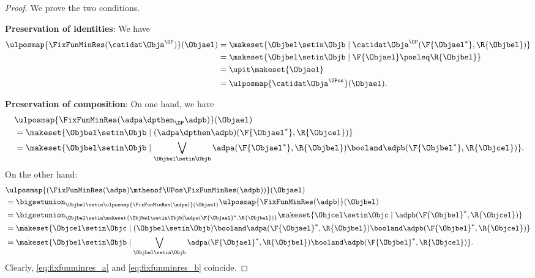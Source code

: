 \begin{proof}
    We prove the two conditions.

    \textbf{Preservation of identities}:
    We have
    \begin{equation}
        \begin{aligned}
            \ulposmap{\FixFunMinRes(\catidat\Obja^{\DP})}(\Objael) & =\makeset{ \Objbel\setin \Objb\mid \catidat\Obja^{\DP}(\F{\Objael^*},\R{\Objbel})} \\
                                                                   & =\makeset{ \Objbel \setin \Objb\mid \F{\Objael}\posleq\R{\Objbel}} \\
                                                                   & =\upit \makeset{ \Objael} \\
                                                                   & =\ulposmap{\catidat\Obja^{\UPos}}(\Objael).
        \end{aligned}
    \end{equation}

    \textbf{Preservation of composition}:
    On one hand, we have
    \begin{equation}
        \label{eq:fixfunminres_a}
        \begin{aligned}
            ~ & \ulposmap{\FixFunMinRes(\adpa\dpthen_\DP \adpb)}(\Objael) \\
              & =\makeset{ \Objbel\setin \Objb\mid (\adpa\dpthen \adpb)(\F{\Objael^*},\R{\Objcel})} \\
              & =\makeset{ \Objbel\setin \Objb\mid \bigvee_{\Objbel \setin \Objb}\adpa(\F{\Objael^*},\R{\Objbel})\booland \adpb(\F{\Objbel^*},\R{\Objcel})}.
        \end{aligned}
    \end{equation}
    On the other hand:
    \begin{equation}
        \label{eq:fixfunminres_b}
        \begin{aligned}
             & \ulposmap{(\FixFunMinRes(\adpa)\mthenof\UPos \FixFunMinRes(\adpb))}(\Objael) \\
             & =\bigsetunion_{\Objbel \setin \ulposmap{\FixFunMinRes(\adpa)}(\Objael)}\ulposmap{\FixFunMinRes(\adpb)}(\Objbel) \\
             & =\bigsetunion_{\Objbel \setin \makeset{ \Objbel \setin \Objb \mid \adpa(\F{\Objael}^*,\R{\Objbel})}} \makeset{\Objcel \setin \Objc \mid \adpb(\F{\Objbel}^*,\R{\Objcel})} \\
             & =\makeset{\Objcel\setin \Objc \mid (\Objbel \setin \Objb)\booland \adpa(\F{\Objael}^*,\R{\Objbel})\booland \adpb(\F{\Objbel}^*,\R{\Objcel})} \\
             & =\makeset{ \Objbel\setin \Objb\mid \bigvee_{\Objbel \setin \Objb}\adpa(\F{\Objael}^*,\R{\Objbel})\booland \adpb(\F{\Objbel}^*,\R{\Objcel})}.
        \end{aligned}
    \end{equation}
    Clearly, \cref{eq:fixfunminres_a} and \cref{eq:fixfunminres_b} coincide.
\end{proof}


